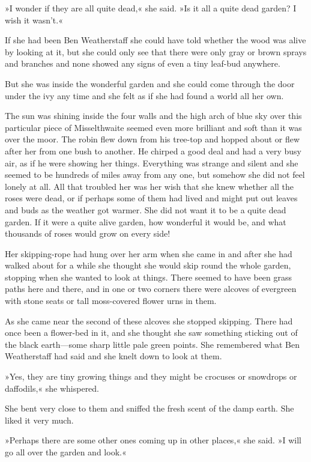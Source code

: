 »I wonder if they are all quite dead,« she said. »Is it all a quite dead garden? I wish it wasn't.«

If she had been Ben Weatherstaff she could have told whether the wood was alive by looking at it, but she could only see that there were only gray or brown sprays and branches and none showed any signs of even a tiny leaf-bud anywhere.

But she was inside the wonderful garden and she could come through the door under the ivy any time and she felt as if she had found a world all her own.

The sun was shining inside the four walls and the high arch of blue sky over this particular piece of Misselthwaite seemed even more brilliant and soft than it was over the moor. The robin flew down from his tree-top and hopped about or flew after her from one bush to another. He chirped a good deal and had a very busy air, as if he were showing her things. Everything was strange and silent and she seemed to be hundreds of miles away from any one, but somehow she did not feel lonely at all. All that troubled her was her wish that she knew whether all the roses were dead, or if perhaps some of them had lived and might put out leaves and buds as the weather got warmer. She did not want it to be a quite dead garden. If it were a quite alive garden, how wonderful it would be, and what thousands of roses would grow on every side!

Her skipping-rope had hung over her arm when she came in and after she had walked about for a while she thought she would skip round the whole garden, stopping when she wanted to look at things. There seemed to have been grass paths here and there, and in one or two corners there were alcoves of evergreen with stone seats or tall moss-covered flower urns in them.

As she came near the second of these alcoves she stopped skipping. There had once been a flower-bed in it, and she thought she saw something sticking out of the black earth—some sharp little pale green points. She remembered what Ben Weatherstaff had said and she knelt down to look at them.

»Yes, they are tiny growing things and they might be crocuses or snowdrops or daffodils,« she whispered.

She bent very close to them and sniffed the fresh scent of the damp earth. She liked it very much.

»Perhaps there are some other ones coming up in other places,« she said. »I will go all over the garden and look.«

